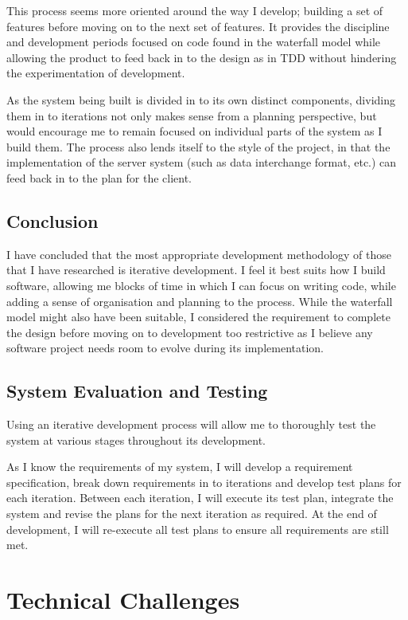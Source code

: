 \documentclass[a4papert,11pt,notitlepage]{ltxdoc}
\begin{document}
This process seems more oriented around the way I develop; building a set of features before moving on to the next set of features. It provides the discipline and development periods focused on code found in the waterfall model while allowing the product to feed back in to the design as in TDD without hindering the experimentation of development.

As the system being built is divided in to its own distinct components, dividing them in to iterations not only makes sense from a planning perspective, but would encourage me to remain focused on individual parts of the system as I build them. The process also lends itself to the style of the project, in that the implementation of the server system (such as data interchange format, etc.) can feed back in to the plan for the client.

\subsection{Conclusion}
I have concluded that the most appropriate development methodology of those that I have researched is iterative development. I feel it best suits how I build software, allowing me blocks of time in which I can focus on writing code, while adding a sense of organisation and planning to the process. While the waterfall model might also have been suitable, I considered the requirement to complete the design before moving on to development too restrictive as I believe any software project needs room to evolve during its implementation.

\subsection{System Evaluation and Testing}
Using an iterative development process will allow me to thoroughly test the system at various stages throughout its development. 

As I know the requirements of my system, I will develop a requirement specification, break down requirements in to iterations and develop test plans for each iteration. Between each iteration, I will execute its test plan, integrate the system and revise the plans for the next iteration as required. At the end of development, I will re-execute all test plans to ensure all requirements are still met.

\section{Technical Challenges}
\end{document}
